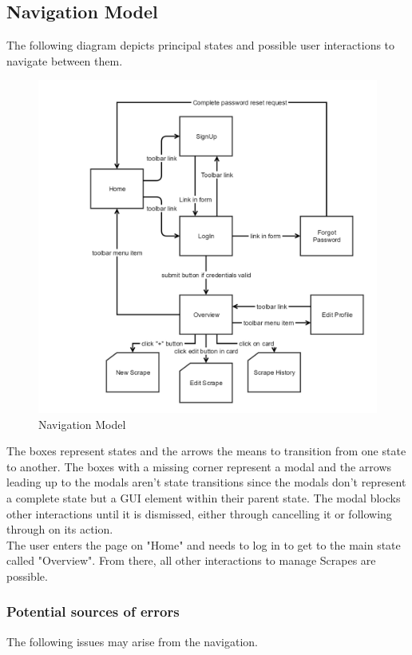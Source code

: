 \documentclass[titlepage, 12pt]{article}
\begin{document}
\subsection{Navigation Model}

The following diagram depicts principal states and possible user interactions to navigate between them.

\begin{figure}[H]
  \includegraphics[width=0.95\linewidth]{navigationmodel_waas.png}
  \caption{Navigation Model}
  \label{fig:navigationModel}
\end{figure}

The boxes represent states and the arrows the means to transition from one state to another. The boxes with a missing corner represent a modal and the arrows leading up to the modals aren't state transitions since the modals don't
represent a complete state but a GUI element within their parent state. The modal blocks other interactions until it is dismissed, either through cancelling it or following through on its action. \\
The user enters the page on "Home" and needs to log in to get to the main state called "Overview". From there, all other interactions to manage Scrapes are possible.

\subsubsection{Potential sources of errors}
The following issues may arise from the navigation.
\end{document}

